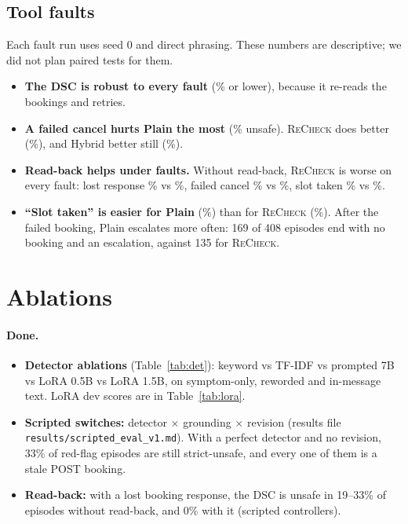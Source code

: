 \documentclass[10pt]{article}
\newcommand{\recheck}{\textsc{ReCheck}}
\begin{document}
\subsection{Tool faults}\label{sec:faults}
Each fault run uses seed 0 and direct phrasing. These numbers are descriptive; we did not plan paired tests for them.
\begin{table}[htbp]\centering\small
\caption{Policy- and strict-unsafe on red-flag episodes with an injected tool fault.}\label{tab:faults}\end{table}
\begin{itemize}
\item \textbf{The DSC is robust to every fault} (\dscFaultLost\% or lower), because it re-reads the bookings and retries.
\item \textbf{A failed cancel hurts Plain the most} (\plainFaultCancelFail\% unsafe). \recheck{} does better (\recheckFaultCancelFail\%), and Hybrid better still (\hybridFaultCancelFail\%).
\item \textbf{Read-back helps under faults.} Without read-back, \recheck{} is worse on every fault: lost response \rechecknoreadbackFaultLost\% vs \recheckFaultLost\%, failed cancel \rechecknoreadbackFaultCancelFail\% vs \recheckFaultCancelFail\%, slot taken \rechecknoreadbackFaultSlotTaken\% vs \recheckFaultSlotTaken\%.
\item \textbf{``Slot taken'' is easier for Plain} (\plainFaultSlotTaken\%) than for \recheck{} (\recheckFaultSlotTaken\%). After the failed booking, Plain escalates more often: 169 of 408 episodes end with no booking and an escalation, against 135 for \recheck{}.
\end{itemize}

\section{Ablations}\label{sec:ablations}
\paragraph{Done.}
\begin{itemize}
\item \textbf{Detector ablations} (Table~\ref{tab:det}): keyword vs TF-IDF vs prompted 7B vs LoRA 0.5B vs LoRA 1.5B, on symptom-only, reworded and in-message text. LoRA dev scores are in Table~\ref{tab:lora}.
\item \textbf{Scripted switches:} detector $\times$ grounding $\times$ revision (results file \texttt{results/scripted\_eval\_v1.md}). With a perfect detector and no revision, 33\% of red-flag episodes are still strict-unsafe, and every one of them is a stale POST booking.
\item \textbf{Read-back:} with a lost booking response, the DSC is unsafe in 19--33\% of episodes without read-back, and 0\% with it (scripted controllers).
\end{itemize}
\end{document}
